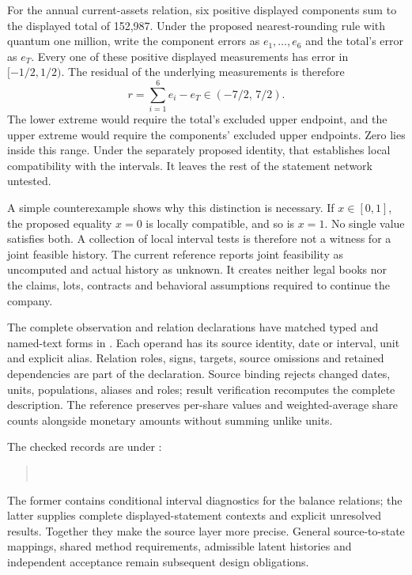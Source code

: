 For the annual current-assets relation, six positive displayed components
sum to the displayed total of 152,987. Under the proposed nearest-rounding
rule with quantum one million, write the component errors as
\(e_1,\ldots,e_6\) and the total's error as \(e_T\). Every one of these
positive displayed measurements has error in \([-1/2,1/2)\). The residual
of the underlying measurements is therefore
\begin{equation}
\label{eq:statement-context-residual-range}
  r=\sum_{i=1}^{6}e_i-e_T\in(-7/2,\,7/2).
\end{equation}
The lower extreme would require the total's excluded upper endpoint, and
the upper extreme would require the components' excluded upper endpoints.
Zero lies inside this range. Under the separately proposed identity, that
establishes local compatibility with the intervals. It leaves the rest of
the statement network untested.

A simple counterexample shows why this distinction is necessary. If
\(x\in[0,1]\), the proposed equality \(x=0\) is locally compatible,
and so is \(x=1\). No single value satisfies both. A collection of local
interval tests is therefore not a witness for a joint feasible history.
The current reference reports joint feasibility as uncomputed and actual
history as unknown. It creates neither legal books nor the claims, lots,
contracts and behavioral assumptions required to continue the company.

The complete observation and relation declarations have matched typed and
named-text forms in . Each operand
has its source identity, date or interval, unit and explicit alias. Relation
roles, signs, targets, source omissions and retained dependencies are part of
the declaration. Source binding rejects changed dates, units, populations,
aliases and roles; result verification recomputes the complete description.
The reference preserves per-share values and weighted-average share counts
alongside monetary amounts without summing unlike units.

The checked records are under :
\begin{quote}\small
{}\\
\end{quote}
The former contains conditional interval diagnostics for the balance
relations; the latter supplies complete displayed-statement contexts and
explicit unresolved results. Together they make the source layer more
precise. General source-to-state mappings, shared method requirements,
admissible latent histories and independent acceptance remain subsequent
design obligations.
